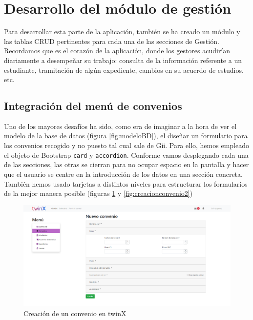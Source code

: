 \section{Desarrollo del módulo de gestión}
\label{sec:gestion}

Para desarrollar esta parte de la aplicación, también se ha creado un módulo y las tablas CRUD pertinentes para cada una de las secciones de Gestión. Recordamos que es el corazón de la aplicación, donde los gestores acudirían diariamente a desempeñar su trabajo: consulta de la información referente a un estudiante, tramitación de algún expediente, cambios en su acuerdo de estudios, etc.

\subsection{Integración del menú de convenios}

Uno de los mayores desafíos ha sido, como era de imaginar a la hora de ver el modelo de la base de datos (figura \ref{fig:modeloBD}), el diseñar un formulario para los convenios recogido y no puesto tal cual sale de Gii. Para ello, hemos empleado el objeto de Bootstrap \texttt{card} y \texttt{accordion}. Conforme vamos desplegando cada una de las secciones, las otras se cierran para no ocupar espacio en la pantalla y hacer que el usuario se centre en la introducción de los datos en una sección concreta. También hemos usado tarjetas a distintos niveles para estructurar los formularios de la mejor manera posible (figuras \ref{fig:creacionconvenio1} y \ref{fig:creacionconvenio2})

\begin{figure}
	\centering
	\includegraphics[width=\textwidth]{img/Capturas de twinX/creacion_convenio_1}
	\caption{Creación de un convenio en twinX}
	\label{fig:creacionconvenio1}
\end{figure}

